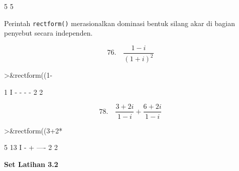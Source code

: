 \documentclass[a4paper,11pt,oneside,enabledeprecatedfontcommands]{scrbook}
\newenvironment{eulernotebook}{}{}
\newenvironment{eulercomment}{\par\medskip\noindent}{\par\medskip}
\newenvironment{eulerformula}{}{}
\begin{document}
\begin{eulernotebook}
\begin{euleroutput}
                                               5    5
\end{euleroutput}
\begin{eulercomment}
Perintah \texttt{rectform()} merasionalkan dominasi bentuk silang akar di bagian penyebut secara independen.
\end{eulercomment}
\begin{eulerformula}
\[
76. \quad \frac{1-i}{(1+i)^2}
\]
\end{eulerformula}
\begin{eulerprompt}
>&rectform((1-%
\end{eulerprompt}
\begin{euleroutput}
                                                 1   I
                                               - - - -
                                                 2   2
\end{euleroutput}
\begin{eulerformula}
\[
78. \quad \frac{3+2i}{1-i}+\frac{6+2i}{1-i}
\]
\end{eulerformula}
\begin{eulerprompt}
>&rectform((3+2*%
\end{eulerprompt}
\begin{euleroutput}
                                              5   13 I
                                              - + ----
                                              2    2
\end{euleroutput}
\begin{eulercomment}
\textbf{Set Latihan 3.2}


\end{eulercomment}
\end{eulernotebook}
\end{document}
